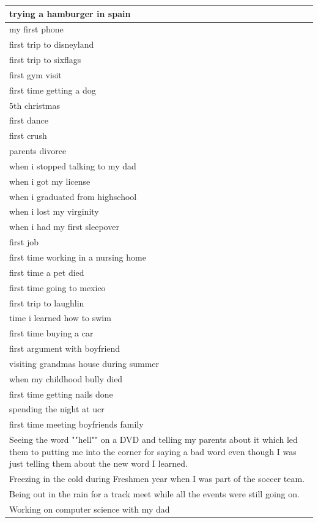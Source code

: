 \documentclass[
  .7em,
  letterpaper,
  DIV=11,
  numbers=noendperiod]{scrartcl}
\begin{document}
\begin{table}
\begin{tabular}{l}
\hline
trying a hamburger in spain\\
\hline
my first phone\\
\hline
first trip to disneyland\\
\hline
first trip to sixflags\\
\hline
first gym visit\\
\hline
first time getting a dog\\
\hline
5th christmas\\
\hline
first dance\\
\hline
first crush\\
\hline
parents divorce\\
\hline
when i stopped talking to my dad\\
\hline
when i got my license\\
\hline
when i graduated from highschool\\
\hline
when i lost my virginity\\
\hline
when i had my first sleepover\\
\hline
first job\\
\hline
first time working in a nursing home\\
\hline
first time a pet died\\
\hline
first time going to mexico\\
\hline
first trip to laughlin\\
\hline
time i learned how to swim\\
\hline
first time buying a car\\
\hline
first argument with boyfriend\\
\hline
visiting grandmas house during summer\\
\hline
when my childhood bully died\\
\hline
first time getting nails done\\
\hline
spending the night at ucr\\
\hline
first time meeting boyfriends family\\
\hline
Seeing the word ""hell"" on a DVD and telling my parents about it which led them to putting me into the corner for saying a bad word even though I was just telling them about the new word I learned.\\
\hline
Freezing in the cold during Freshmen year when I was part of the soccer team.\\
\hline
Being out in the rain for a track meet while all the events were still going on.\\
\hline
Working on computer science with my dad\\

\end{tabular}
\end{table}
\end{document}
